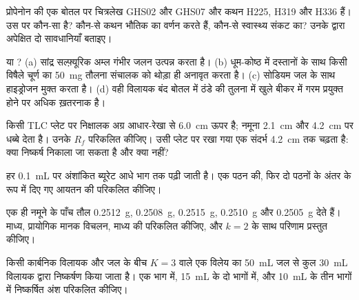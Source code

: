 \begin{exercise}[$\star$]\label{exo:b1:lab-techniques-1:1}
प्रोपेनोन की एक बोतल पर चित्रलेख GHS02 और GHS07 और
कथन H225, H319 और H336 हैं। उस पर कौन-सा  है? कौन-से
कथन भौतिक  का वर्णन करते हैं, कौन-से स्वास्थ्य संकट का? उनके द्वारा अपेक्षित दो
सावधानियाँ बताइए।
\end{exercise}

\begin{exercise}[$\star$]\label{exo:b1:lab-techniques-1:2}
 या ? (a) सांद्र सल्फ़्यूरिक अम्ल गंभीर जलन उत्पन्न करता है।
(b) धूम-कोष्ठ में दस्तानों के साथ किसी विषैले चूर्ण का \qty{50}{mg} तौलना
संचालक को थोड़ा ही अनावृत करता है। (c) सोडियम जल के साथ हाइड्रोजन मुक्त करता है।
(d) वही विलायक बंद बोतल में ठंडे की तुलना में खुले बीकर में गरम प्रयुक्त होने पर
अधिक ख़तरनाक है।
\end{exercise}

\begin{exercise}[$\star$]\label{exo:b1:lab-techniques-1:3}
किसी TLC प्लेट पर निक्षालक अग्र आधार-रेखा से \qty{6.0}{cm} ऊपर है;
नमूना \qty{2.1}{cm} और \qty{4.2}{cm} पर धब्बे देता है। उनके
$R_f$ परिकलित कीजिए। उसी प्लेट पर रखा गया एक संदर्भ \qty{4.2}{cm} तक चढ़ता है:
क्या निष्कर्ष निकाला जा सकता है और क्या नहीं?
\end{exercise}

\begin{exercise}[$\star$]\label{exo:b1:lab-techniques-1:4}
हर \qty{0.1}{mL} पर अंशांकित ब्यूरेट आधे भाग तक पढ़ी जाती है।
एक पठन की, फिर दो पठनों के अंतर के रूप में दिए गए
आयतन की  परिकलित कीजिए।
\end{exercise}

\begin{exercise}[$\star\star$]\label{exo:b1:lab-techniques-1:5}
एक ही नमूने के पाँच तौल \qty{0.2512}{g}, \qty{0.2508}{g},
\qty{0.2515}{g}, \qty{0.2510}{g} और \qty{0.2505}{g} देते हैं। माध्य,
प्रायोगिक मानक विचलन, माध्य की  परिकलित कीजिए,
और $k = 2$ के साथ परिणाम प्रस्तुत कीजिए।
\end{exercise}

\begin{exercise}[$\star\star$]\label{exo:b1:lab-techniques-1:6}
किसी कार्बनिक विलायक और जल के बीच  $K = 3$ वाले एक विलेय का
\qty{50}{mL} जल से कुल \qty{30}{mL} विलायक द्वारा निष्कर्षण किया जाता है।
एक भाग में, \qty{15}{mL} के दो भागों में,
और \qty{10}{mL} के तीन भागों में निष्कर्षित अंश परिकलित कीजिए।
\end{exercise}

